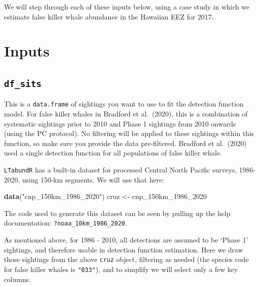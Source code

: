 \documentclass[
]{book}
\newenvironment{Shaded}{\begin{snugshade}}{\end{snugshade}}
\newcommand{\DecValTok}[1]{\textcolor[rgb]{0.00,0.00,0.81}{#1}}
\newcommand{\KeywordTok}[1]{\textcolor[rgb]{0.13,0.29,0.53}{\textbf{#1}}}
\newcommand{\NormalTok}[1]{#1}
\newcommand{\StringTok}[1]{\textcolor[rgb]{0.31,0.60,0.02}{#1}}
\begin{document}
We will step through each of these inputs below, using a case study in which we estimate false killer whale abundance in the Hawaiian EEZ for 2017.

\hypertarget{inputs-1}{%
\section*{Inputs}\label{inputs-1}}

\hypertarget{df_sits}{%
\subsection*{\texorpdfstring{\texttt{df\_sits}}{df\_sits}}\label{df_sits}}

This is a \texttt{data.frame} of sightings you want to use to fit the detection function model. For false killer whales in Bradford et al.~(2020), this is a combination of systematic sightings prior to 2010 and Phase 1 sightings from 2010 onwards (using the PC protocol). No filtering will be applied to these sightings within this function, so make sure you provide the data pre-filtered. Bradford et al.~(2020) used a single detection function for all populations of false killer whale.

\texttt{LTabundR} has a built-in dataset for processed Central North Pacific surveys, 1986-2020, using 150-km segments. We will use that here:

\begin{Shaded}
\begin{Highlighting}[]
\KeywordTok{data}\NormalTok{(}\StringTok{"cnp_150km_1986_2020"}\NormalTok{)}
\NormalTok{cruz <-}\StringTok{ }\NormalTok{cnp_150km_}\DecValTok{1986}\NormalTok{_}\DecValTok{2020}
\end{Highlighting}
\end{Shaded}

The code used to generate this dataset can be seen by pulling up the help documentation: \texttt{?noaa\_10km\_1986\_2020}.

As mentioned above, for 1986 - 2010, all detections are assumed to be `Phase 1' sightings, and therefore usable in detection function estimation. Here we draw those sightings from the above \texttt{cruz} object, filtering as needed (the species code for false killer whales is \texttt{"033"}), and to simplify we will select only a few key columns.
\end{document}
